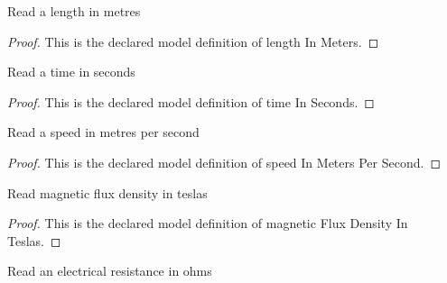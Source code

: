 \begin{definition}
  \label{def:physics:phyx-mini-0979:phyxminiproblems-problemphyxmini0979-lengthinmeters}
  Read a length in metres
\end{definition}
\begin{proof}
  This is the declared model definition of length In Meters.
\end{proof}
\begin{definition}
  \label{def:physics:phyx-mini-0979:phyxminiproblems-problemphyxmini0979-timeinseconds}
  Read a time in seconds
\end{definition}
\begin{proof}
  This is the declared model definition of time In Seconds.
\end{proof}
\begin{definition}
  \label{def:physics:phyx-mini-0979:phyxminiproblems-problemphyxmini0979-speedinmeterspersecond}
  Read a speed in metres per second
\end{definition}
\begin{proof}
  This is the declared model definition of speed In Meters Per Second.
\end{proof}
\begin{definition}
  \label{def:physics:phyx-mini-0979:phyxminiproblems-problemphyxmini0979-magneticfluxdensityinteslas}
  Read magnetic flux density in teslas
\end{definition}
\begin{proof}
  This is the declared model definition of magnetic Flux Density In Teslas.
\end{proof}
\begin{definition}
  \label{def:physics:phyx-mini-0979:phyxminiproblems-problemphyxmini0979-resistanceinohms}
  Read an electrical resistance in ohms
\end{definition}

